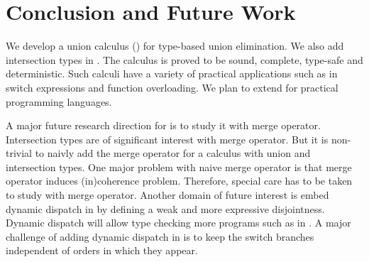 \section{Conclusion and Future Work}
\label{sec:conclusion}

We develop a union calculus (\cal) for type-based union elimination. 
We also add intersection types in
\cal. The calculus is proved to be sound, complete, type-safe and deterministic.
Such calculi have a variety of practical applications such as in switch expressions
and function overloading. We plan to extend \cal for practical programming languages.

A major future research direction for \cal is to study it with merge operator.
Intersection types are of significant interest with merge operator. But it is non-trivial
to naivly add the merge operator for a calculus with union and intersection types.
One major problem with naive merge operator is that merge operator induces (in)coherence problem.
Therefore, special care has to be taken to study \cal with merge operator.
Another domain of future interest is embed dynamic dispatch in \cal by defining a weak
and more expressive disjointness. Dynamic dispatch will allow type checking more programs
such as in . A major challenge of adding dynamic dispatch in
\cal is to keep the switch branches independent of orders in which they appear.